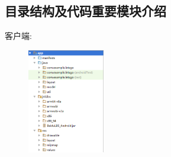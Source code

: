 \documentclass[UTF8]{article}
\begin{document}
\subsection{目录结构及代码重要模块介绍}
客户端:
\begin{figure}[H]
    \center
    \includegraphics[width=0.3\textwidth]{images/client1.png}
\end{figure}
\end{document}
